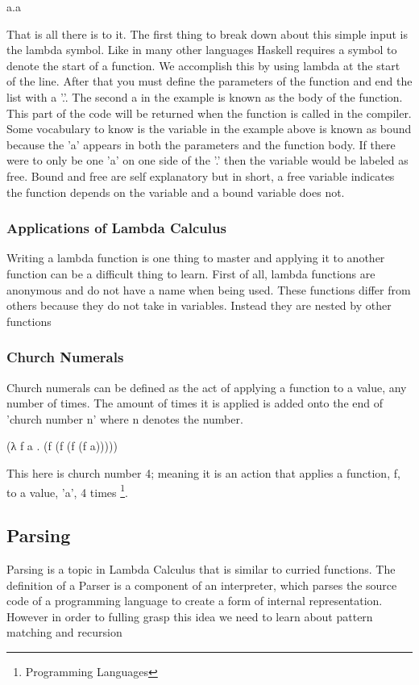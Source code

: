 \documentclass{article}
\begin{document}
    \medskip
              \lambda a.a
    \medskip
    
    \noindent That is all there is to it. The first thing to break down about this simple input is the lambda symbol. Like in many other languages Haskell requires a symbol to denote the start of a function. We accomplish this by using lambda at the start of the line. After that you must define the parameters of the function and end the list with a '.'. The second a in the example is known as the body of the function. This part of the code will be returned when the function is called in the compiler. Some vocabulary to know is the variable in the example above is known as bound because the 'a' appears in both the parameters and the function body. If there were to only be one 'a' on one side of the '.' then the variable would be labeled as free. Bound and free are self explanatory but in short, a free variable indicates the function depends on the variable and a bound variable does not. 
        \subsubsection{Applications of Lambda Calculus}
        Writing a lambda function is one thing to master and applying it to another function can be a difficult thing to learn. First of all, lambda functions are anonymous and do not have a name when being used. These functions differ from others because they do not take in variables. Instead they are nested by other functions 
    
        \subsubsection{Church Numerals}
        Church numerals can be defined as the act of applying a function to a value, any number of times. The amount of times it is applied is added onto the end of 'church number n' where n denotes the number.
        
        \medskip
             (\lambda λ f a . (f (f (f (f a)))))
        \medskip
    
    This here is church number 4; meaning it is an action that applies a function, f, to a value, 'a', 4 times \footnote{Programming Languages}.
        
    \subsection{Parsing}
    Parsing is a topic in Lambda Calculus that is similar to curried functions. The definition of a Parser is a component of an interpreter, which parses the source code of a programming language to create a form of internal representation. However in order to fulling grasp this idea we need to learn about pattern matching and recursion
        
\end{document}
